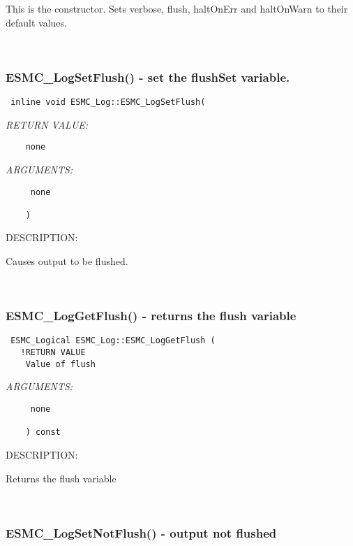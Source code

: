    This is the constructor.  Sets verbose, flush, haltOnErr and haltOnWarn
   to their default values.
   
 
\mbox{}\hrulefill\ 
 

  \subsubsection [ESMC\_LogSetFlush()] {ESMC\_LogSetFlush() - set the flushSet variable.}


\begin{verbatim} 
 inline void ESMC_Log::ESMC_LogSetFlush(\end{verbatim}{\em RETURN VALUE:}
\begin{verbatim}    none\end{verbatim}{\em ARGUMENTS:}
\begin{verbatim}     none
 
    ) 
 \end{verbatim}
{\sf DESCRIPTION:\\ }

 
   Causes output to be flushed.
    
 
\mbox{}\hrulefill\ 
 

  \subsubsection [ESMC\_LogGetFlush()] {ESMC\_LogGetFlush() - returns the flush variable }


\begin{verbatim} 
 ESMC_Logical ESMC_Log::ESMC_LogGetFlush (
   !RETURN VALUE
    Value of flush\end{verbatim}{\em ARGUMENTS:}
\begin{verbatim}     none
 
    ) const 
 \end{verbatim}
{\sf DESCRIPTION:\\ }

 
   Returns the flush variable 
    
 
\mbox{}\hrulefill\ 
 

                     \subsubsection [ESMC\_LogSetNotFlush()] {ESMC\_LogSetNotFlush() - output not flushed}


